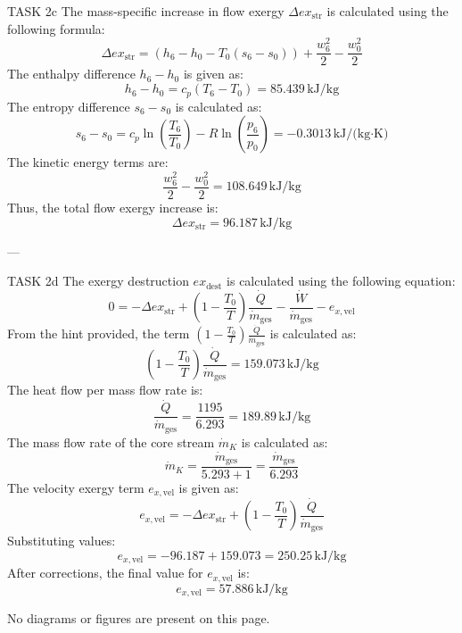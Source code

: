 TASK 2c  
The mass-specific increase in flow exergy \( \Delta ex_{\text{str}} \) is calculated using the following formula:  
\[
\Delta ex_{\text{str}} = (h_6 - h_0 - T_0(s_6 - s_0)) + \frac{w_6^2}{2} - \frac{w_0^2}{2}
\]  
The enthalpy difference \( h_6 - h_0 \) is given as:  
\[
h_6 - h_0 = c_p(T_6 - T_0) = 85.439 \, \text{kJ/kg}
\]  
The entropy difference \( s_6 - s_0 \) is calculated as:  
\[
s_6 - s_0 = c_p \ln\left(\frac{T_6}{T_0}\right) - R \ln\left(\frac{p_6}{p_0}\right) = -0.3013 \, \text{kJ/(kg·K)}
\]  
The kinetic energy terms are:  
\[
\frac{w_6^2}{2} - \frac{w_0^2}{2} = 108.649 \, \text{kJ/kg}
\]  
Thus, the total flow exergy increase is:  
\[
\Delta ex_{\text{str}} = 96.187 \, \text{kJ/kg}
\]  

---

TASK 2d  
The exergy destruction \( ex_{\text{dest}} \) is calculated using the following equation:  
\[
0 = -\Delta ex_{\text{str}} + \left(1 - \frac{T_0}{T}\right) \frac{\dot{Q}}{\dot{m}_{\text{ges}}} - \frac{\dot{W}}{\dot{m}_{\text{ges}}} - e_{x,\text{vel}}
\]  
From the hint provided, the term \( \left(1 - \frac{T_0}{T}\right) \frac{\dot{Q}}{\dot{m}_{\text{ges}}} \) is calculated as:  
\[
\left(1 - \frac{T_0}{T}\right) \frac{\dot{Q}}{\dot{m}_{\text{ges}}} = 159.073 \, \text{kJ/kg}
\]  
The heat flow per mass flow rate is:  
\[
\frac{\dot{Q}}{\dot{m}_{\text{ges}}} = \frac{1195}{6.293} = 189.89 \, \text{kJ/kg}
\]  
The mass flow rate of the core stream \( \dot{m}_K \) is calculated as:  
\[
\dot{m}_K = \frac{\dot{m}_{\text{ges}}}{5.293 + 1} = \frac{\dot{m}_{\text{ges}}}{6.293}
\]  
The velocity exergy term \( e_{x,\text{vel}} \) is given as:  
\[
e_{x,\text{vel}} = -\Delta ex_{\text{str}} + \left(1 - \frac{T_0}{T}\right) \frac{\dot{Q}}{\dot{m}_{\text{ges}}}
\]  
Substituting values:  
\[
e_{x,\text{vel}} = -96.187 + 159.073 = 250.25 \, \text{kJ/kg}
\]  
After corrections, the final value for \( e_{x,\text{vel}} \) is:  
\[
e_{x,\text{vel}} = 57.886 \, \text{kJ/kg}
\]  

No diagrams or figures are present on this page.